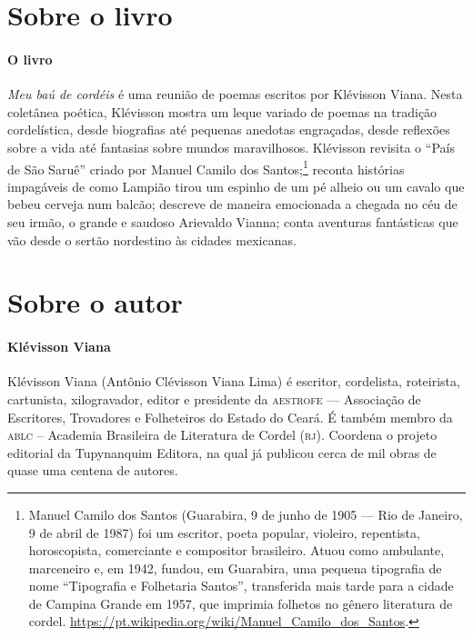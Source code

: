 \documentclass[11pt]{extarticle}
\begin{document}
\section{Sobre o livro}

\paragraph{O livro} \textit{Meu baú de cordéis} é uma reunião de poemas escritos por Klévisson Viana. 
Nesta coletânea poética, Klévisson mostra um leque variado de poemas na 
tradição cordelística, desde biografias até pequenas anedotas engraçadas, desde 
reflexões sobre a vida até fantasias sobre mundos maravilhosos. Klévisson revisita 
o “País de São Saruê” criado por Manuel Camilo dos Santos;\footnote{
Manuel Camilo dos Santos (Guarabira, 9 de junho de 1905 — Rio de Janeiro, 9 de abril de 1987) foi um escritor, poeta popular, violeiro, repentista, horoscopista, comerciante e compositor brasileiro.
Atuou como ambulante, marceneiro e, em 1942, fundou, em Guarabira, uma pequena tipografia de nome ``Tipografia e Folhetaria Santos'', transferida mais tarde para a cidade de Campina Grande em 1957, que imprimia  folhetos no gênero literatura de cordel. \url{https://pt.wikipedia.org/wiki/Manuel_Camilo_dos_Santos}. }
reconta histórias impagáveis 
de como Lampião tirou um espinho de um pé alheio ou um cavalo que bebeu cerveja num 
balcão; descreve de maneira emocionada a chegada no céu de seu irmão, o grande e 
saudoso Arievaldo Vianna; conta aventuras fantásticas que vão desde o sertão nordestino 
às cidades mexicanas.

\section{Sobre o autor}

\paragraph{Klévisson Viana}

Klévisson Viana (Antônio Clévisson Viana Lima) é escritor, cordelista, roteirista, cartunista, xilogravador, editor e presidente da \textsc{aestrofe} --- Associação de Escritores, Trovadores e Folheteiros do Estado do Ceará. É também membro da \textsc{ablc} -- Academia Brasileira de Literatura de Cordel (\textsc{rj}). Coordena o projeto editorial da Tupynanquim Editora, na qual já publicou cerca de mil obras de quase uma centena de autores. 
\end{document}
